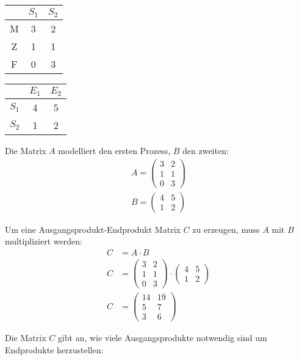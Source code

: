 \begin{center}
\begin{tabular}{c|c|c}
& $S_1$ & $S_2$ \\
\hline
M & 3 & 2 \\
\hline
Z & 1 & 1 \\
\hline
F & 0 & 3
\end{tabular}
\end{center}

\begin{center}
\begin{tabular}{c|c|c}
& $E_1$ & $E_2$ \\
\hline
$S_1$ & 4 & 5 \\
\hline
$S_2$ & 1 & 2
\end{tabular}
\end{center}

\begin{flushleft}
Die Matrix $A$ modelliert den ersten Prozess, $B$ den zweiten:
\begin{align}
    A=\begin{pmatrix}
        3 & 2 \\
        1 & 1 \\
        0 & 3
    \end{pmatrix} \\
    B=\begin{pmatrix}
        4 & 5 \\
        1 & 2
    \end{pmatrix}
\end{align}

Um eine Ausgangsprodukt-Endprodukt Matrix $C$ zu erzeugen, muss $A$ mit $B$ multipliziert werden:
\begin{align}
    C&=A \cdot B \\
    C&=\begin{pmatrix}
        3 & 2 \\
        1 & 1 \\
        0 & 3
    \end{pmatrix} \cdot
    \begin{pmatrix}
        4 & 5 \\
        1 & 2
    \end{pmatrix} \\
    C&=\begin{pmatrix}
        14 & 19 \\
        5 & 7 \\
        3 & 6
    \end{pmatrix}
\end{align}

Die Matrix $C$ gibt an, wie viele Ausgangsprodukte notwendig sind um Endprodukte herzustellen:
\end{flushleft}

